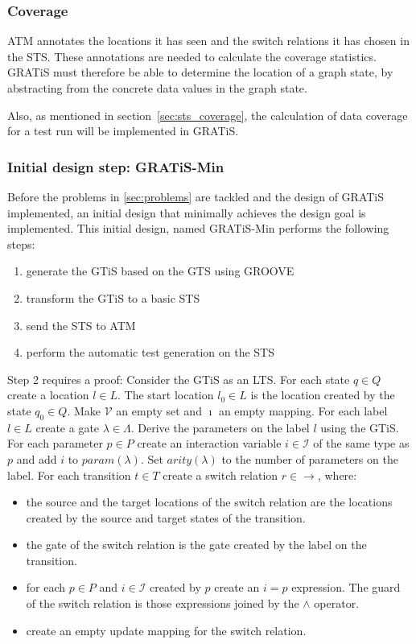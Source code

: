 \subsubsection{Coverage}
ATM annotates the locations it has seen and the switch relations it has chosen in the STS. These annotations are needed to calculate the coverage statistics. GRATiS must therefore be able to determine the location of a graph state, by abstracting from the concrete data values in the graph state.

Also, as mentioned in section~\ref{sec:sts_coverage}, the calculation of data coverage for a test run will be implemented in GRATiS.

\subsubsection{Initial design step: GRATiS-Min}
Before the problems in \ref{sec:problems} are tackled and the design of GRATiS implemented, an initial design that minimally achieves the design goal is implemented. This initial design, named GRATiS-Min performs the following steps:
\begin{enumerate}
  \item generate the GTiS based on the GTS using GROOVE
  \item transform the GTiS to a basic STS
  \item send the STS to ATM
  \item perform the automatic test generation on the STS
\end{enumerate}

Step 2 requires a proof: Consider the GTiS as an LTS. For each state $q \in Q$ create a location $l \in L$. The start location $l_0 \in L$ is the location created by the state $q_0 \in Q$. Make $\mathcal{V}$ an empty set and $\imath$ an empty mapping. For each label $l \in L$ create a gate $\lambda \in \Lambda$. Derive the parameters on the label $l$ using the GTiS. For each parameter $p \in P$ create an interaction variable $i \in \mathcal{I}$ of the same type as $p$ and add $i$ to $param(\lambda)$. Set $arity(\lambda)$ to the number of parameters on the label. For each transition $t \in T$ create a switch relation $r \in \rightarrow$, where:
\begin{itemize}
  \item the source and the target locations of the switch relation are the locations created by the source and target states of the transition.
  \item the gate of the switch relation is the gate created by the label on the transition.
  \item for each $p \in P$ and $i \in \mathcal{I}$ created by $p$ create an $i = p$ expression. The guard of the switch relation is those expressions joined by the $\land$ operator.
  \item create an empty update mapping for the switch relation.
\end{itemize}

